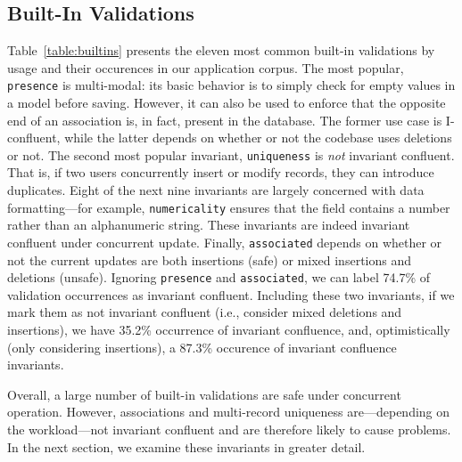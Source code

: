 \subsection{Built-In Validations}

Table~\ref{table:builtins} presents the eleven most common built-in
validations by usage and their occurences in our application
corpus. The most popular, \texttt{presence} is multi-modal: its basic
behavior is to simply check for empty values in a model before
saving. However, it can also be used to enforce that the opposite end
of an association is, in fact, present in the database. The former use
case is I-confluent, while the latter depends on whether or not the
codebase uses deletions or not. The second most popular invariant,
\texttt{uniqueness} is \textit{not} invariant confluent. That is, if
two users concurrently insert or modify records, they can introduce
duplicates. Eight of the next nine invariants are largely concerned
with data formatting---for example, \texttt{numericality} ensures that
the field contains a number rather than an alphanumeric string. These
invariants are indeed invariant confluent under concurrent
update. Finally, \texttt{associated} depends on whether or not the
current updates are both insertions (safe) or mixed insertions and
deletions (unsafe). Ignoring \texttt{presence} and
\texttt{associated}, we can label 74.7\% of validation occurrences as
invariant confluent. Including these two invariants, if we mark them
as not invariant confluent (i.e., consider mixed deletions and
insertions), we have 35.2\% occurrence of invariant confluence, and,
optimistically (only considering insertions), a 87.3\% occurence of
invariant confluence invariants.

Overall, a large number of built-in validations are safe under
concurrent operation. However, associations and multi-record
uniqueness are---depending on the workload---not invariant confluent
and are therefore likely to cause problems. In the next section, we
examine these invariants in greater detail.

